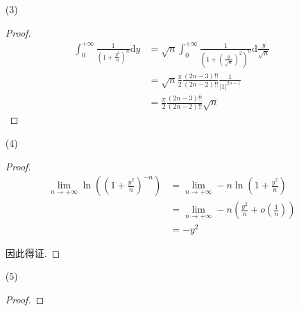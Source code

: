 \documentclass{article}
\begin{document}
\begin{enumerate}
\begin{enumerate}
\begin{proof}[解]
\begin{equation}
                \nonumber
            \end{equation} \par
            因此有 $2nx^2I(n+1)=(2n-1)I(n)$ , 即 $\frac{I(n+1)}{I(n)}=\frac{2n-1}{2nx^2}$ . \par
            由(1)又有 $I(1)=\frac{\pi}{2|x|}$ , 因此得 \begin{equation}
                I(n)=\frac{\pi}{2}\frac{(2n-3)!!}{(2n-2)!!}\frac{1}{|x|^{2n-1}}
                \nonumber
            \end{equation}
        \end{proof}
        \item[(3)] \begin{proof}
            \begin{equation}
                \begin{aligned}
                    \int_{0}^{+\infty}\frac{1}{\left(1+\frac{y^2}{n}\right)^n}\mathrm{d}y
                    &=\sqrt{n}\int_{0}^{+\infty}\frac{1}{\left(1+\left(\frac{y}{\sqrt{n}}\right)^2\right)^n}\mathrm{d}\frac{y}{\sqrt{n}} \\
                    &=\sqrt{n}\frac{\pi}{2}\frac{(2n-3)!!}{(2n-2)!!}\frac{1}{|1|^{2n-1}} \\
                    &=\frac{\pi}{2}\frac{(2n-3)!!}{(2n-2)!!}\sqrt{n}
                \end{aligned}
                \nonumber
            \end{equation}
        \end{proof}
        \item[(4)] \begin{proof}
            \begin{equation}
                \begin{aligned}
                    \lim_{n\rightarrow+\infty}\ln\left(\left(1+\frac{y^2}{n}\right)^{-n}\right)
                    &=\lim_{n\rightarrow+\infty}-n\ln\left(1+\frac{y^2}{n}\right) \\
                    &=\lim_{n\rightarrow+\infty}-n\left(\frac{y^2}{n}+o\left(\frac{1}{n}\right)\right) \\
                    &=-y^2
                \end{aligned}
                \nonumber
            \end{equation} \par
            因此得证.
        \end{proof}
        \item[(5)] \begin{proof}

\end{proof}
\end{enumerate}
\end{enumerate}
\end{document}
